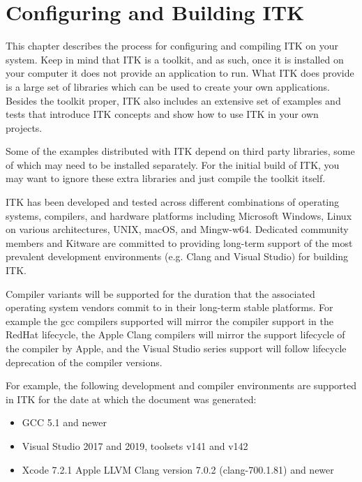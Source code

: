 \chapter{Configuring and Building ITK}
\label{chapter:Installation}

This chapter describes the process for configuring and compiling ITK on your
system. Keep in mind that ITK is a toolkit, and as such, once it is installed
on your computer it does not provide an application to run. What ITK does
provide is a large set of libraries which can be used to create your own
applications. Besides the toolkit proper, ITK also includes an extensive set of
examples and tests that introduce ITK concepts and show how to use ITK in your
own projects.

Some of the examples distributed with ITK depend on third party libraries, some
of which may need to be installed separately. For the initial build of ITK, you
may want to ignore these extra libraries and just compile the toolkit itself.

ITK has been developed and tested across different combinations of operating
systems, compilers, and hardware platforms including Microsoft Windows, Linux on
various architectures, UNIX, macOS, and Mingw-w64. Dedicated community members and
Kitware are committed to providing long-term support of the most prevalent
development environments (e.g. Clang and Visual Studio) for building ITK.

Compiler variants will be supported for the duration that the associated operating
system vendors commit to in their long-term stable platforms. For example the gcc
compilers supported will mirror the compiler support in the RedHat lifecycle, the
Apple Clang compilers will mirror the support lifecycle of the compiler by Apple, and
the Visual Studio series support will follow lifecycle deprecation of the compiler
versions.

For example, the following development and compiler environments are supported
in ITK for the date at which the document was generated:
\begin{itemize}
\item GCC 5.1 and newer
\item Visual Studio 2017 and 2019, toolsets v141 and v142
\item Xcode 7.2.1 Apple LLVM Clang version 7.0.2 (clang-700.1.81) and newer
\end{itemize}

